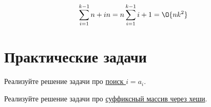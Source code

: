 \documentclass[addpoints]{exam}
\begin{document}
\begin{questions}
\begin{solution}

$$\sum\limits_{i=1}^{k-1} {n + in} = n \sum\limits_{i=1}^{k-1} {i + 1} = \O{n k^2}$$

\end{solution}


\section{Практические задачи}

\question[1] Реализуйте решение задачи про \hyperref[binary_search]{поиск $i = a_i$}. 

\question[1] Реализуйте решение задачи про \hyperref[sufarray]{суффиксный массив через хеши}. 

\end{questions}


\begin{center}
\pointtable[h][questions]
\end{center}
\end{document}
